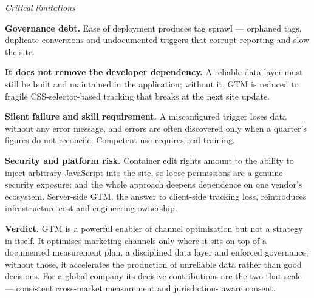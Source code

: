 \begin{qlist}
\textit{Critical limitations}
\begin{apts}\setcounter{enumi}{8}
\item \textbf{Governance debt.} Ease of deployment produces tag sprawl ---
      orphaned tags, duplicate conversions and undocumented triggers that
      corrupt reporting and slow the site.
\item \textbf{It does not remove the developer dependency.} A reliable data
      layer must still be built and maintained in the application; without it,
      GTM is reduced to fragile CSS-selector-based tracking that breaks at the
      next site update.
\item \textbf{Silent failure and skill requirement.} A misconfigured trigger
      loses data without any error message, and errors are often discovered
      only when a quarter's figures do not reconcile. Competent use requires
      real training.
\item \textbf{Security and platform risk.} Container edit rights amount to the
      ability to inject arbitrary JavaScript into the site, so loose
      permissions are a genuine security exposure; and the whole approach
      deepens dependence on one vendor's ecosystem. Server-side GTM, the answer
      to client-side tracking loss, reintroduces infrastructure cost and
      engineering ownership.
\end{apts}

\textbf{Verdict.} GTM is a powerful enabler of channel optimisation but not a
strategy in itself. It optimises marketing channels only where it sits on top
of a documented measurement plan, a disciplined data layer and enforced
governance; without those, it accelerates the production of unreliable data
rather than good decisions. For a global company its decisive contributions are
the two that scale --- consistent cross-market measurement and jurisdiction-
aware consent.


\end{qlist}
